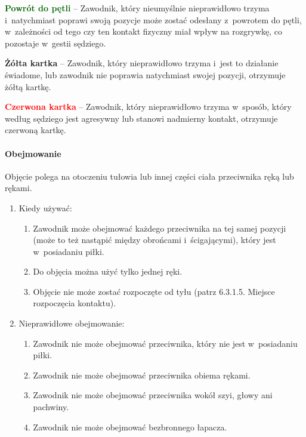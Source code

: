 \documentclass[12pt,a4paper]{article}
\newcommand\redcard[1]{\bgroup\textcolor{red}{\textbf{#1}}}
\newcommand\yellowcard[1]{\bgroup\textcolor{darkyellow}{\textbf{#1}}}
\newcommand\other[1]{\bgroup\textcolor{darkgreen}{\textbf{#1}}}
\begin{document}
\other{Powrót do pętli} -- Zawodnik, który nieumyślnie nieprawidłowo
trzyma i~natychmiast poprawi swoją pozycje może zostać odesłany z~powrotem do pętli, w~zależności od tego czy ten kontakt fizyczny miał
wpływ na rozgrywkę, co pozostaje w~gestii sędziego.

\yellowcard{Żółta kartka} -- Zawodnik, który nieprawidłowo trzyma i~jest to
działanie świadome, lub zawodnik nie poprawia natychmiast swojej
pozycji, otrzymuje żółtą kartkę.

\redcard{Czerwona kartka} -- Zawodnik, który nieprawidłowo trzyma w~sposób,
który według sędziego jest agresywny lub stanowi nadmierny kontakt,
otrzymuje czerwoną kartkę.

\paragraph{Obejmowanie}
Objęcie polega na otoczeniu tułowia lub
innej części ciała przeciwnika ręką lub rękami.

\begin{enumerate}
	\item
	      Kiedy używać:

	      \begin{enumerate}
		      \item
		            Zawodnik może obejmować każdego przeciwnika na tej samej pozycji
		            (może to też nastąpić między obrońcami i~ścigającymi), który jest w~posiadaniu piłki.
		      \item
		            Do objęcia można użyć tylko jednej ręki.
		      \item
		            Objęcie nie może zostać rozpoczęte od tyłu (patrz 6.3.1.5. Miejsce
		            rozpoczęcia kontaktu).
	      \end{enumerate}
	\item
	      Nieprawidłowe obejmowanie:

	      \begin{enumerate}
		      \item Zawodnik nie może obejmować przeciwnika, który nie jest w~posiadaniu
		            piłki.
		      \item
		            Zawodnik nie może obejmować przeciwnika obiema rękami.
		      \item
		            Zawodnik nie może obejmować przeciwnika wokół szyi, głowy ani
		            pachwiny.
		      \item
		            Zawodnik nie może obejmować bezbronnego łapacza.
	      \end{enumerate}
\end{enumerate}
\end{document}
